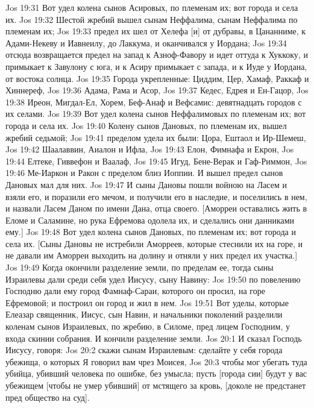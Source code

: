 \vs Jos 19:31 Вот удел колена сынов Асировых, по племенам их; вот города и села их.
\rsbpar\vs Jos 19:32 Шестой жребий вышел сынам Неффалима, сынам Неффалима по племенам их;
\vs Jos 19:33 предел их шел от Хелефа [и] от дубравы,  в Цананниме, к Адами-Некеву и Иавнеилу, до Лаккума, и оканчивался у Иордана;
\vs Jos 19:34 отсюда возвращается предел на запад к Азноф-Фавору и идет оттуда к Хуккоку, и примыкает к Завулону с юга, и к Асиру примыкает с запада, и к Иуде у Иордана, от востока солнца.
\vs Jos 19:35 Города укрепленные: Циддим, Цер, Хамаф, Раккаф и Хиннереф,
\vs Jos 19:36 Адама, Рама и Асор,
\vs Jos 19:37 Кедес, Едрея и Ен-Гацор,
\vs Jos 19:38 Иреон, Мигдал-Ел, Хорем, Беф-Анаф и Вефсамис: девятнадцать городов с их селами.
\vs Jos 19:39 Вот удел колена сынов Неффалимовых по племенам их; вот города и села их.
\rsbpar\vs Jos 19:40 Колену сынов Дановых, по племенам их, вышел жребий седьмой;
\vs Jos 19:41 пределом удела их были: Цора, Ештаол и Ир-Шемеш,
\vs Jos 19:42 Шаалаввин, Аиалон и Ифла,
\vs Jos 19:43 Елон, Фимнафа и Екрон,
\vs Jos 19:44 Елтеке, Гиввефон и Ваалаф,
\vs Jos 19:45 Игуд, Бене-Верак и Гаф-Риммон,
\vs Jos 19:46 Ме-Иаркон и Ракон с пределом близ Иоппии. И вышел предел сынов Дановых мал для них.
\vs Jos 19:47 И сыны Дановы пошли войною на Ласем и взяли его, и поразили его мечом, и получили его в наследие, и поселились в нем, и назвали Ласем Даном по имени Дана, отца своего. [Аморреи оставались жить в Еломе и Саламине, но рука Ефремова одолела их, и сделались они данниками ему.]
\vs Jos 19:48 Вот удел колена сынов Дановых, по племенам их; вот города и села их. [Сыны Дановы не истребили Аморреев, которые стеснили их на горе, и не давали им Аморреи выходить на долину и отняли у них предел их участка.]
\rsbpar\vs Jos 19:49 Когда окончили разделение земли, по пределам ее, тогда сыны Израилевы дали среди себя удел Иисусу, сыну Навину:
\vs Jos 19:50 по повелению Господню дали ему город Фамнаф-Сараи, которого он просил, на горе Ефремовой; и построил он город и жил в нем.
\vs Jos 19:51 Вот уделы, которые Елеазар священник, Иисус, сын Навин, и начальники поколений разделили коленам сынов Израилевых, по жребию, в Силоме, пред лицем Господним, у входа скинии собрания. И кончили разделение земли.
\vs Jos 20:1 И сказал Господь Иисусу, говоря:
\vs Jos 20:2 скажи сынам Израилевым: сделайте у себя города убежища, о которых Я говорил вам чрез Моисея,
\vs Jos 20:3 чтобы мог убегать туда убийца, убивший человека по ошибке, без умысла; пусть [города сии] будут у вас убежищем [чтобы не умер убивший] от мстящего за кровь, [доколе не предстанет пред общество на суд].
